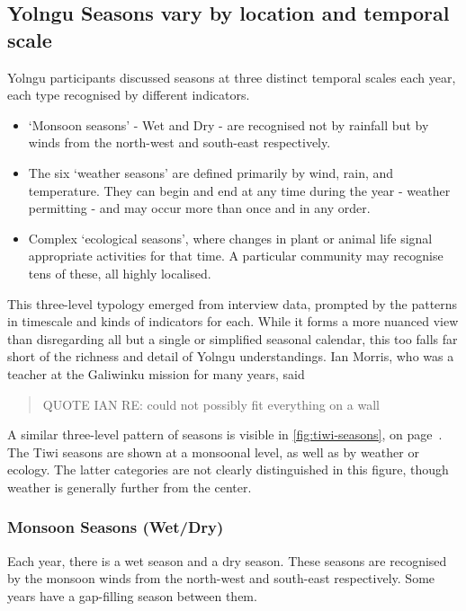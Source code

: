 \subsection{Yolngu Seasons vary by location and temporal scale}
\label{subsec:three-seasons-scales}

Yolngu participants discussed seasons at three distinct temporal scales
each year, each type recognised by different indicators.
\begin{itemize}
\item `Monsoon seasons' - Wet and Dry - are recognised not by rainfall but
        by winds from the north-west and south-east respectively.
\item The six `weather seasons' are defined primarily by wind, rain, and temperature.
        They can begin and end at any time during the year - weather permitting -
        and may occur more than once and in any order.
\item Complex `ecological seasons', where changes in plant or animal life
        signal appropriate activities for that time.  A particular community
        may recognise tens of these, all highly localised.
\end{itemize}

This three-level typology emerged from interview data, prompted by
the patterns in timescale and kinds of indicators for each.
While it forms a more nuanced view than disregarding all but a single or
simplified seasonal calendar, this too falls far short of the richness
and detail of Yolngu understandings.
%
Ian Morris, who was a teacher at the Galiwinku mission for many years,
said \blockquote{
    QUOTE IAN RE: could not possibly fit everything on a wall
}

A similar three-level pattern of seasons is visible in \cref{fig:tiwi-seasons},
on page~\pageref{fig:tiwi-seasons}.  The Tiwi seasons are shown at a monsoonal level,
as well as by weather or ecology.  The latter categories are not clearly distinguished
in this figure, though weather is generally further from the center.


\subsubsection{Monsoon Seasons (Wet/Dry)}

Each year, there is a wet season and a dry season.  These seasons are
recognised by the monsoon winds from the north-west and south-east
respectively.  Some years have a gap-filling season between them.

